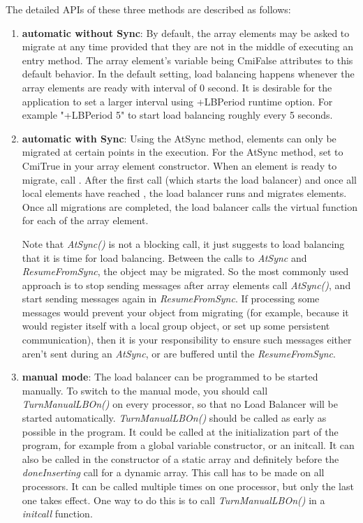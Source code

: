 The detailed APIs of these three methods are described as follows:
\begin{enumerate}

\item {\bf automatic without Sync}: By default, the array elements 
may be asked to migrate at any time provided that they are not in 
the middle of executing an entry method. 
The array element's variable  being CmiFalse attributes
to this default behavior. In the default setting, load balancing happens
whenever the array elements are ready with interval of 0 second. It is 
desirable for the application to set a larger interval using +LBPeriod
runtime option. For example "+LBPeriod 5" to start load balancing roughly
every 5 seconds.

\item {\bf automatic with Sync}: Using the AtSync method, elements can 
only be migrated at certain points in the execution. For the AtSync method, 
set  to CmiTrue in your 
array element constructor.  When an element is ready to migrate,
call .  
After the first  call (which starts the load balancer)
and once all local elements have reached ,
the load balancer runs and migrates elements.  Once
all migrations are completed, the load balancer calls the 
virtual function  for each of the
array element.  

Note that {\em AtSync()} is not a blocking call, it just suggests to load
balancing that it is time for load balancing. Between the calls to
{\em AtSync} and {\em ResumeFromSync}, the object
may be migrated. So the most commonly used approach is to stop sending
messages after array elements call {\em AtSync()}, and start sending
messages again in {\em ResumeFromSync}.
If processing some messages would prevent your object
from migrating (for example, because it would register itself with
a local group object, or set up some persistent communication),
then it is your responsibility to ensure such messages either aren't
sent during an {\em AtSync}, or are buffered until the {\em ResumeFromSync}.

\item {\bf manual mode}: The load balancer can be programmed to be started
manually. To switch to the manual mode, you should call
{\em TurnManualLBOn()} on every processor, so that no Load Balancer will 
be started automatically. {\em TurnManualLBOn()} should be called as 
early as possible in the program. It could be called at the initialization 
part of the program, 
for example from a global variable constructor, or an initcall.
It can also be called in the constructor of a static array and
definitely before the {\em doneInserting} call for a dynamic array.  This call 
has to be made on all processors. It can be called multiple times on one 
processor, but only the last one takes effect. One way to do this is to call
{\em TurnManualLBOn()} in a {\em initcall} function.  


\end{enumerate}
